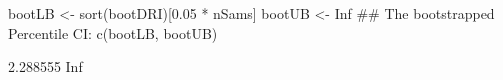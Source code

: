 \begin{Schunk}
\begin{Sinput}
 bootLB <- sort(bootDRI)[0.05 * nSams]
 bootUB <- Inf
 ## The bootstrapped Percentile CI:
 c(bootLB, bootUB)
\end{Sinput}
\begin{Soutput}
[1] 2.288555      Inf
\end{Soutput}
\end{Schunk}
